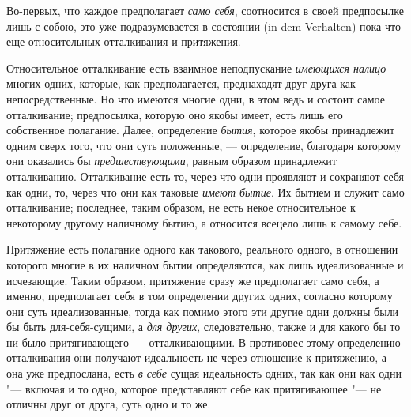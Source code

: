 Во-первых, что каждое предполагает {\em само себя},
соотносится в своей предпосылке лишь с собою, это уже подразумевается в 
состоянии (in dem Verhalten) пока что еще относительных отталкивания и
притяжения.

Относительное отталкивание есть взаимное неподпускание
{\em имеющихся налицо} многих одних, которые, как
предполагается, преднаходят друг друга как непосредственные. Но что имеются
многие одни, в этом ведь и состоит самое отталкивание; предпосылка, которую
оно якобы имеет, есть лишь его собственное полагание. Далее, определение
{\em бытия}, которое якобы принадлежит одним сверх
того, что они суть положенные, — определение, благодаря которому они
оказались бы {\em предшествующими}, равным образом
принадлежит отталкиванию. Отталкивание есть то, через что одни проявляют и
сохраняют себя как одни, то, через что они как таковые
{\em имеют бытие}. Их бытием и служит само
отталкивание; последнее, таким образом, не есть некое относительное к
некоторому другому наличному бытию, а относится всецело лишь к самому себе.

Притяжение есть полагание одного как такового, реального одного, в отношении
которого многие в их наличном бытии определяются, как лишь идеализованные и
исчезающие. Таким образом, притяжение сразу же предполагает само себя, а
именно, предполагает себя в том определении других одних, согласно которому
они суть идеализованные, тогда как помимо этого эти другие одни должны были
бы быть для-себя-сущими, а {\em для других},
следовательно, также и для какого бы то ни было притягивающего
—~отталкивающими. В противовес этому определению отталкивания они получают
идеальность не через отношение к притяжению, а она уже предпослана, есть
{\em в себе} сущая идеальность одних, так как они как
одни "--- включая и то одно, которое представляют себе как притягивающее "--- не
отличны друг от друга, суть одно и то же.

